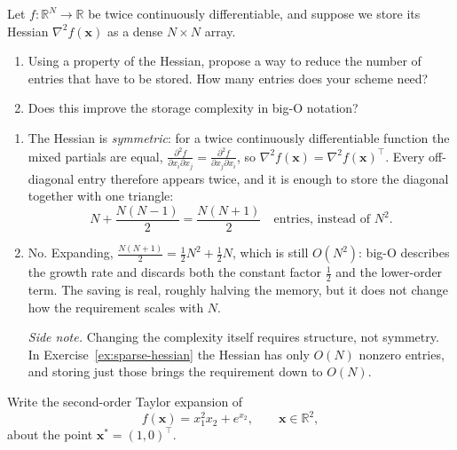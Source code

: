 \begin{exercise} %
    
    Let $f: \mathbb{R}^N \to \mathbb{R}$ be twice continuously differentiable, and suppose we store its Hessian $\nabla^2 f(\mathbf{x})$ as a dense $N \times N$ array.
    \begin{enumerate}[label=(\alph*)]
        \item Using a property of the Hessian, propose a way to reduce the number of entries that have to be stored. How many entries does your scheme need?
        \item Does this improve the storage complexity in big-O notation?
    \end{enumerate}
    
\end{exercise}

\begin{solution}
    
    \begin{enumerate}[label=(\alph*)]
        \item The Hessian is \emph{symmetric}: for a twice continuously differentiable function the mixed partials are equal, $\frac{\partial^2 f}{\partial x_i \partial x_j} = \frac{\partial^2 f}{\partial x_j \partial x_i}$, so $\nabla^2 f(\mathbf{x}) = \nabla^2 f(\mathbf{x})^\top$. Every off-diagonal entry therefore appears twice, and it is enough to store the diagonal together with one triangle:
        \[
            N + \frac{N(N-1)}{2} = \frac{N(N+1)}{2} \quad \text{entries, instead of } N^2.
        \]
        \item No. Expanding, $\frac{N(N+1)}{2} = \frac{1}{2}N^2 + \frac{1}{2}N$, which is still $O(N^2)$: big-O describes the growth rate and discards both the constant factor $\tfrac{1}{2}$ and the lower-order term. The saving is real, roughly halving the memory, but it does not change how the requirement scales with $N$.

        \emph{Side note.} Changing the complexity itself requires structure, not symmetry. In Exercise~\ref{ex:sparse-hessian} the Hessian has only $O(N)$ nonzero entries, and storing just those brings the requirement down to $O(N)$.
    \end{enumerate}
    
\end{solution}

\begin{exercise} %
    
    Write the second-order Taylor expansion of
    \[
        f(\mathbf{x}) = x_1^2 x_2 + e^{x_2}, \qquad \mathbf{x} \in \mathbb{R}^2,
    \]
    about the point $\mathbf{x}^* = (1, 0)^\top$.
    
\end{exercise}

